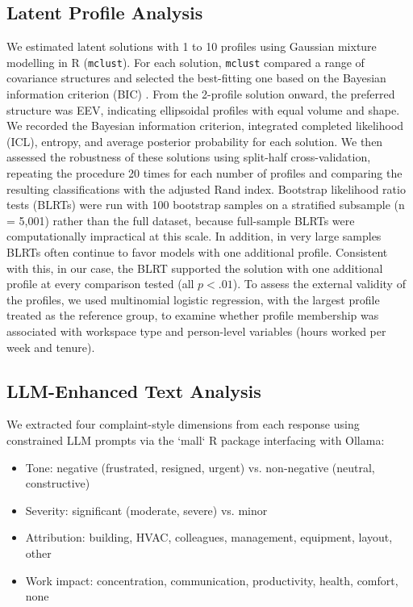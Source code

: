 \documentclass[sigconf]{acmart}
\begin{document}
\subsection{Latent Profile Analysis}
We estimated latent solutions with 1 to 10 profiles using Gaussian mixture modelling in R (\texttt{mclust}). For each solution, \texttt{mclust} compared a range of covariance structures and selected the best-fitting one based on the Bayesian information criterion (BIC) \cite{spurk2020}. From the 2-profile solution onward, the preferred structure was EEV, indicating ellipsoidal profiles with equal volume and shape. We recorded the Bayesian information criterion, integrated completed likelihood (ICL), entropy, and average posterior probability for each solution. We then assessed the robustness of these solutions using split-half cross-validation, repeating the procedure 20 times for each number of profiles and comparing the resulting classifications with the adjusted Rand index. Bootstrap likelihood ratio tests (BLRTs) were run with 100 bootstrap samples on a stratified subsample (n = 5,001) rather than the full dataset, because full-sample BLRTs were computationally impractical at this scale. In addition, in very large samples BLRTs often continue to favor models with one additional profile. Consistent with this, in our case, the BLRT supported the solution with one additional profile at every comparison tested (all $p < .01$). To assess the external validity of the profiles, we used multinomial logistic regression, with the largest profile treated as the reference group, to examine whether profile membership was associated with workspace type and person-level variables (hours worked per week and tenure).

\subsection{LLM-Enhanced Text Analysis}
We extracted four complaint-style dimensions from each response using constrained LLM prompts via the `mall` R package interfacing with Ollama:
\begin{itemize}
    \item Tone: negative (frustrated, resigned, urgent) vs. non-negative (neutral, constructive)
    \item Severity: significant (moderate, severe) vs. minor
    \item Attribution: building, HVAC, colleagues, management, equipment, layout, other
    \item  Work impact: concentration, communication, productivity, health, comfort, none
\end{itemize}
\end{document}
